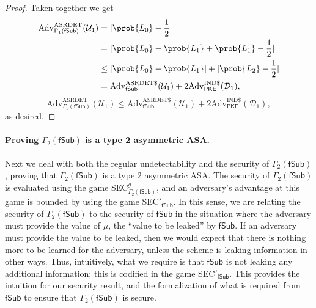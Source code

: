 \begin{proof}
Taken together we get
\iffullversion
\begin{align*}
\mathrm{Adv}^\mathrm{ASRDET}_{\Gamma_1(\mathsf{fSub})}(\mathcal{U}_1)
&= |\prob{L_0}-\frac{1}{2} \\
&= |\prob{L_0}-\prob{L_1}+\prob{L_1}-\frac{1}{2}| \\
&\le |\prob{L_0}-\prob{L_1}|+|\prob{L_2}-\frac{1}{2}| \\
&= \mathrm{Adv}^{\mathrm{ASRDET}\$}_{\mathsf{fSub}}(\mathcal{U}_1) + 2\mathrm{Adv}^{\mathrm{IND}\$}_\mathsf{PKE}(\mathcal{D}_1),
\end{align*}
\else
\[
\mathrm{Adv}^\mathrm{ASRDET}_{\Gamma_1(\mathsf{fSub})}(\mathcal{U}_1) \le \mathrm{Adv}^{\mathrm{ASRDET}\$}_{\mathsf{fSub}}(\mathcal{U}_1) + 2\mathrm{Adv}^{\mathrm{IND}\$}_\mathsf{PKE}(\mathcal{D}_1),
\]
\fi
as desired.
\end{proof}


\paragraph{Proving $\Gamma_2(\mathsf{fSub})$ is a type 2 asymmetric ASA.} Next we deal with both the regular undetectability and the security of $\Gamma_2(\mathsf{fSub})$, proving that $\Gamma_2(\mathsf{fSub})$ is a type 2 asymmetric ASA. The security of $\Gamma_2(\mathsf{fSub})$ is evaluated using the game SEC$^g_{\Gamma_2(\mathsf{fSub})}$, and an adversary's advantage at this game is bounded by using the game SEC$'_\mathsf{fSub}$. In this sense, we are relating the security of $\Gamma_2(\mathsf{fSub})$ to the security of $\mathsf{fSub}$ in the situation where the adversary must provide the value of $\mu$, the ``value to be leaked'' by $\mathsf{fSub}$. If an adversary must provide the value to be leaked, then we would expect that there is nothing more to be learned for the adversary, unless the scheme is leaking information in other ways. Thus, intuitively, what we require is that $\mathsf{fSub}$ is not leaking any additional information; this is codified in the game SEC$'_\mathsf{fSub}$. This provides the intuition for our security result, and the formalization of what is required from $\mathsf{fSub}$ to ensure that $\Gamma_2(\mathsf{fSub})$ is secure.

